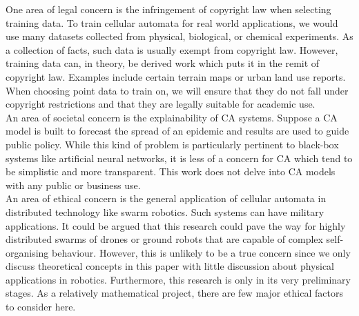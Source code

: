 One area of legal concern is the infringement of copyright law when selecting training data. To train cellular automata for real world applications, we would use many datasets collected from physical, biological, or chemical experiments. As a collection of facts, such data is usually exempt from copyright law. However, training data can, in theory, be derived work which puts it in the remit of copyright law. Examples include certain terrain maps or urban land use reports. When choosing point data to train on, we will ensure that they do not fall under copyright restrictions and that they are legally suitable for academic use.\\

An area of societal concern is the explainability of CA systems. Suppose a CA model is built to forecast the spread of an epidemic and results are used to guide public policy. While this kind of problem is particularly pertinent to black-box systems like artificial neural networks, it is less of a concern for CA which tend to be simplistic and more transparent. This work does not delve into CA models with any public or business use.\\

An area of ethical concern is the general application of cellular automata in distributed technology like swarm robotics. Such systems can have military applications. It could be argued that this research could pave the way for highly distributed swarms of drones or ground robots that are capable of complex self-organising behaviour. However, this is unlikely to be a true concern since we only discuss theoretical concepts in this paper with little discussion about physical applications in robotics. Furthermore, this research is only in its very preliminary stages. As a relatively mathematical project, there are few major ethical factors to consider here.\\